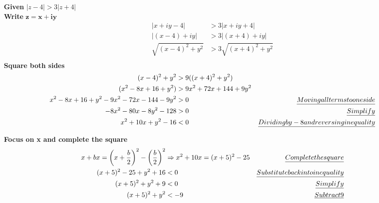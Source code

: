 \documentclass[a4paper, 8pt]{extarticle}
\begin{document}
\begin{examplebox}[2023 Q1(a)]
    \label{sol:2023Q1a}

    \textbf{Given} $|z - 4| > 3|z+4|$ \\
    \textbf{Write} $\boldsymbol{z = x + iy}$
    \begin{align*}
        | x + iy -4|         & > 3 |x + iy + 4|         \\
        | (x - 4) + iy|      & > 3 |(x + 4) + iy|       \\
        \sqrt{(x-4)^2 + y^2} & > 3 \sqrt{(x+4)^2 + y^2} \\
    \end{align*}
    \textbf{Square both sides}
    \begin{align*}
        (x-4)^2 + y^2                                 & > 9((x+4)^2 + y^2)                                                         \\
        (x^2 - 8x + 16 + y^2)                         & > 9x^2 + 72x + 144 + 9y^2                                                  \\
        x^2 - 8x + 16 + y^2 - 9x^2 - 72x - 144 - 9y^2 & > 0                       & \emph{Moving all terms to one side}            \\
        -8x^2 - 80x - 8y^2 - 128                      & > 0                       & \emph{Simplify }                               \\
        x^2 + 10x + y^2 - 16                          & < 0                       & \emph{Dividing by -8 and reversing inequality} \\
    \end{align*}

    \textbf{Focus on x and complete the square}
    \begin{align*}
        x + bx                   = \left(x + \frac{b}{2}\right)^2 - \left(\frac{b}{2}\right)^2 & \Rightarrow  x^2 + 10x = (x + 5)^2 - 25 & \emph{Complete the square}             \\
        (x+5)^2 - 25 + y^2 + 16                                                                & < 0                                     & \emph{Substitute back into inequality} \\
        (x+5)^2 + y^2 + 9                                                                      & < 0                                     & \emph{Simplify}                        \\
        (x+5)^2 + y^2                                                                          & < -9                                    & \emph{Subtract 9}                      \\
    \end{align*}


\end{examplebox}
\end{document}
